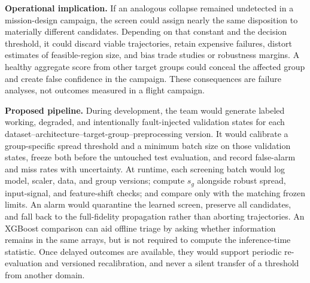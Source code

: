 \documentclass{IEEEtaes}
\begin{document}
\textbf{Operational implication.} If an analogous collapse remained undetected in a mission-design campaign, the screen could assign nearly the same disposition to materially different candidates. Depending on that constant and the decision threshold, it could discard viable trajectories, retain expensive failures, distort estimates of feasible-region size, and bias trade studies or robustness margins. A healthy aggregate score from other target groups could conceal the affected group and create false confidence in the campaign. These consequences are failure analyses, not outcomes measured in a flight campaign.

\textbf{Proposed pipeline.} During development, the team would generate labeled working, degraded, and intentionally fault-injected validation states for each dataset--architecture--target-group--preprocessing version. It would calibrate a group-specific spread threshold and a minimum batch size on those validation states, freeze both before the untouched test evaluation, and record false-alarm and miss rates with uncertainty. At runtime, each screening batch would log model, scaler, data, and group versions; compute $s_g$ alongside robust spread, input-signal, and feature-shift checks; and compare only with the matching frozen limits. An alarm would quarantine the learned screen, preserve all candidates, and fall back to the full-fidelity propagation rather than aborting trajectories. An XGBoost comparison can aid offline triage by asking whether information remains in the same arrays, but is not required to compute the inference-time statistic. Once delayed outcomes are available, they would support periodic re-evaluation and versioned recalibration, and never a silent transfer of a threshold from another domain.
\end{document}
